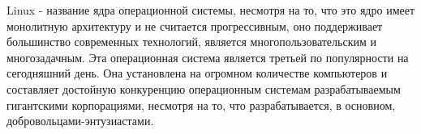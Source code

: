 \intro Linux - название ядра операционной системы, несмотря на то, что это ядро имеет монолитную архитектуру и не считается прогрессивным, оно поддерживает большинство современных технологий, является многопользовательским и многозадачным. Эта операционная система является третьей по популярности на сегодняшний день. Она установлена на огромном количестве компьютеров и составляет достойную конкуренцию операционным системам разрабатываемым гигантскими корпорациями, несмотря на то, что разрабатывается, в основном, добровольцами-энтузиастами.
